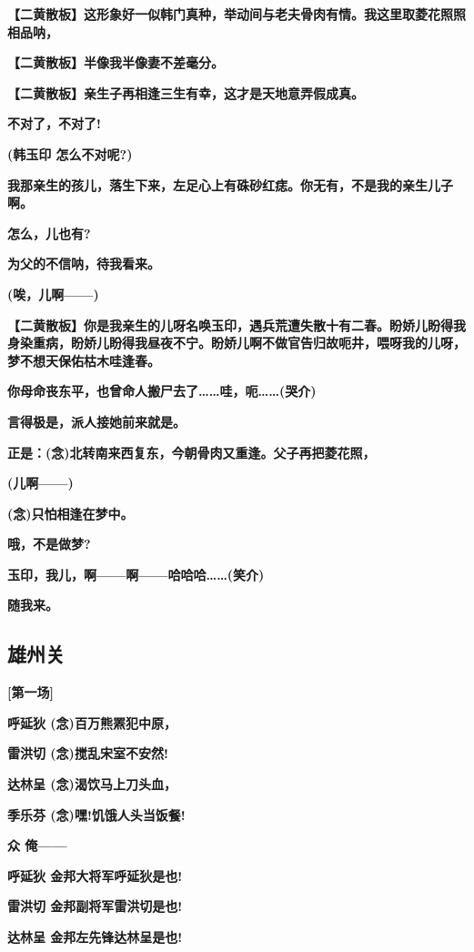 \textbf{【二黄散板】这形象好一似韩门真种，举动间与老夫骨肉有情。我这里取菱花照照相品呐，}

\textbf{【二黄散板】半像我半像妻不差毫分。}

\textbf{【二黄散板】亲生子再相逢三生有幸，这才是天地意弄假成真。}

\textbf{不对了，不对了!}

\textbf{(韩玉印 怎么不对呢?)}

\textbf{我那亲生的孩儿，落生下来，左足心上有硃砂红痣。你无有，不是我的亲生儿子啊。}

\textbf{怎么，儿也有?}

\textbf{为父的不信呐，待我看来。}

\textbf{(唉，儿啊------)}

\textbf{【二黄散板】你是我亲生的儿呀名唤玉印，遇兵荒遭失散十有二春。盼娇儿盼得我身染重病，盼娇儿盼得我昼夜不宁。盼娇儿啊不做官告归故呃井，喂呀我的儿呀，梦不想天保佑枯木哇逢春。}

\textbf{你母命丧东平，也曾命人搬尸去了\ldots{}\ldots{}哇，呃\ldots{}\ldots{}(哭介)}

\textbf{言得极是，派人接她前来就是。}

\textbf{正是：(念)北转南来西复东，今朝骨肉又重逢。父子再把菱花照，}

\textbf{(儿啊------)}

\textbf{(念)只怕相逢在梦中。}

\textbf{哦，不是做梦?}

\textbf{玉印，我儿，啊------啊------哈哈哈\ldots{}\ldots{}(笑介)}

\textbf{随我来。}

\newpage
\hypertarget{ux96c4ux5ddeux5173}{%
\subsection{雄州关}\label{ux96c4ux5ddeux5173}}

\textbf{{[}第一场{]}}

\textbf{呼延狄 (念)百万熊罴犯中原，}

\textbf{雷洪切 (念)搅乱宋室不安然!}

\textbf{达林呈 (念)渴饮马上刀头血，}

\textbf{季乐芬 (念)嘿!饥饿人头当饭餐!}

\textbf{众 俺------}

\textbf{呼延狄 金邦大将军呼延狄是也!}

\textbf{雷洪切 金邦副将军雷洪切是也!}

\textbf{达林呈 金邦左先锋达林呈是也!}

